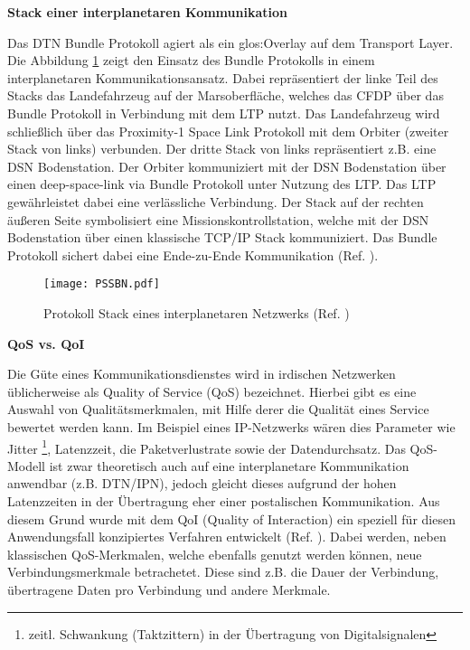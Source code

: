 \textbf{Stack einer interplanetaren Kommunikation}

Das \gls{DTN} Bundle Protokoll agiert als ein \gls{glos:Overlay} auf dem Transport Layer. Die
Abbildung \ref{fig:PSSBN} zeigt den Einsatz des Bundle Protokolls in einem
interplanetaren Kommunikationsansatz.
Dabei repr{\"a}sentiert der linke Teil des Stacks das Landefahrzeug auf der
Marsoberfl{\"a}che, welches das \gls{CFDP} {\"u}ber das Bundle Protokoll in
Verbindung mit dem \gls{LTP} nutzt.
Das Landefahrzeug wird schlie{\ss}lich {\"u}ber das Proximity-1 Space Link
Protokoll mit dem Orbiter (zweiter Stack von links) verbunden. Der dritte Stack
von links repr{\"a}sentiert z.B. eine \gls{DSN} Bodenstation. Der
Orbiter kommuniziert mit der \gls{DSN} Bodenstation {\"u}ber einen deep-space-link via
Bundle Protokoll unter Nutzung des \gls{LTP}. Das \gls{LTP} gew{\"a}hrleistet dabei eine
verl{\"a}ssliche Verbindung. Der Stack auf der rechten {\"a}u{\ss}eren Seite
symbolisiert eine Missionskontrollstation, welche mit der \gls{DSN} Bodenstation
{\"u}ber einen klassische \gls{TCP}/\gls{IP} Stack kommuniziert. Das Bundle Protokoll
sichert dabei eine Ende-zu-Ende Kommunikation (Ref. \cite{DTNBundle}).

\begin{figure}[H]
\centering
\texttt{[image: PSSBN.pdf]}
\caption{Protokoll Stack eines interplanetaren Netzwerks (Ref.
\cite{DTNBundle})}
\label{fig:PSSBN}
\end{figure}

\textbf{QoS vs. QoI}

Die G{\"u}te eines Kommunikationsdienstes wird in irdischen Netzwerken
{\"u}blicherweise als Quality of Service (QoS) bezeichnet. Hierbei gibt es eine
Auswahl von Qualit{\"a}tsmerkmalen, mit Hilfe derer die Qualit{\"a}t eines
Service bewertet werden kann. Im Beispiel eines IP-Netzwerks w{\"a}ren dies
Parameter wie Jitter \footnote{zeitl. Schwankung (Taktzittern) in der
{\"U}bertragung von Digitalsignalen}, Latenzzeit, die Paketverlustrate sowie der Datendurchsatz.
Das QoS-Modell ist zwar theoretisch auch auf eine interplanetare Kommunikation
anwendbar (z.B. DTN/IPN), jedoch gleicht dieses aufgrund der hohen Latenzzeiten
in der {\"U}bertragung eher einer postalischen Kommunikation. Aus diesem Grund
wurde mit dem QoI (Quality of Interaction) ein speziell f{\"u}r diesen
Anwendungsfall konzipiertes Verfahren entwickelt (Ref. \cite{Daher2}). Dabei
werden, neben klassischen QoS-Merkmalen, welche ebenfalls genutzt werden
k{\"o}nnen, neue Verbindungsmerkmale betrachetet. Diese sind z.B. die
Dauer der Verbindung, {\"u}bertragene Daten pro Verbindung und andere Merkmale. 

